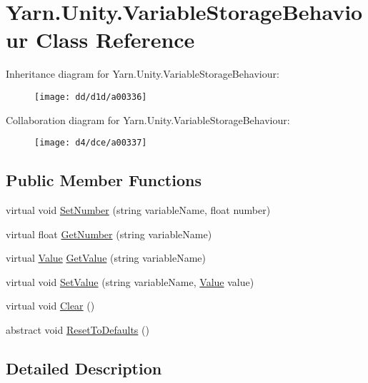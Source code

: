 \hypertarget{a00089}{\section{Yarn.\-Unity.\-Variable\-Storage\-Behaviour Class Reference}
\label{a00089}
}


Inheritance diagram for Yarn.\-Unity.\-Variable\-Storage\-Behaviour\-:
\nopagebreak
\begin{figure}[H]
\begin{center}
\leavevmode
\texttt{[image: dd/d1d/a00336]}
\end{center}
\end{figure}


Collaboration diagram for Yarn.\-Unity.\-Variable\-Storage\-Behaviour\-:
\nopagebreak
\begin{figure}[H]
\begin{center}
\leavevmode
\texttt{[image: d4/dce/a00337]}
\end{center}
\end{figure}
\subsection*{Public Member Functions}
\begin{DoxyCompactItemize}
\item 
virtual void \hyperlink{a00089_ac0d2f2e081944ad197992a26ad1a833c}{Set\-Number} (string variable\-Name, float number)
\item 
virtual float \hyperlink{a00089_add85a45dd65a5d4bd41c9d5ce5f77d19}{Get\-Number} (string variable\-Name)
\item 
virtual \hyperlink{a00086}{Value} \hyperlink{a00089_ac6ebafcbebc2b2d71eba8562490a2f1e}{Get\-Value} (string variable\-Name)
\item 
virtual void \hyperlink{a00089_a25f979b062d63c9e886fe7070ce4561b}{Set\-Value} (string variable\-Name, \hyperlink{a00086}{Value} value)
\item 
virtual void \hyperlink{a00089_a587fe10b367ace190e10f3bcb590a53c}{Clear} ()
\item 
abstract void \hyperlink{a00089_a33fcbff56561e53e0a70b59c56f0c3af}{Reset\-To\-Defaults} ()
\end{DoxyCompactItemize}


\subsection{Detailed Description}


